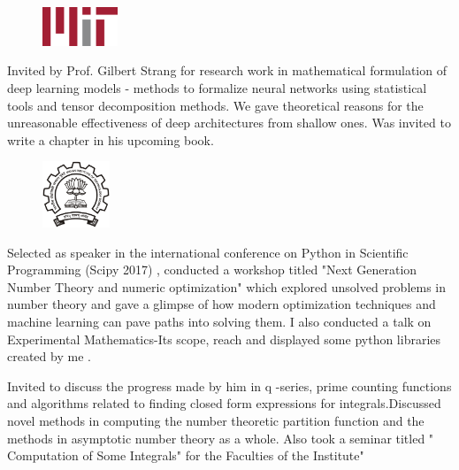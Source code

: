 \documentclass[]{deedy-resume-openfont}
\begin{document}
\begin{minipage}[t]{0.66\textwidth}
\begin{figure}
  \begin{center}
    \includegraphics[width=0.20\textwidth]{mitlogo.png}
  \end{center}
\end{figure}
Invited by Prof. Gilbert Strang for research work in mathematical formulation of deep learning models - methods to formalize neural networks using statistical tools and tensor decomposition methods. We gave theoretical reasons for the unreasonable effectiveness of deep architectures from shallow ones. Was invited to write a chapter in his upcoming book.\newline
\sectionsep


\begin{figure}
  \begin{center}
    \includegraphics[width=0.18\textwidth]{iitblogo.png}
  \end{center}
\end{figure}
Selected as speaker in the international conference on Python in Scientific Programming (Scipy 2017) , conducted a workshop titled "Next Generation Number Theory and numeric optimization" which explored  unsolved problems in number theory and gave a glimpse of how modern optimization techniques and machine learning can pave paths into solving them. I also conducted a talk on Experimental Mathematics-Its scope, reach and displayed some python libraries created by me .
\newline
\sectionsep

Invited to discuss the progress made by him in q -series, prime counting functions and algorithms related to finding closed form expressions for integrals.Discussed novel methods in computing the number theoretic partition function and the methods in asymptotic  number theory as a whole. Also took a seminar titled " Computation of Some Integrals" for the Faculties of the Institute" \newline
\sectionsep


\end{minipage}
\end{document}
